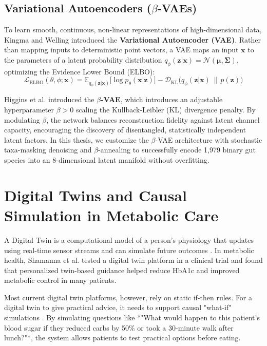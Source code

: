 \subsection{Variational Autoencoders ($\beta$-VAEs)}
To learn smooth, continuous, non-linear representations of high-dimensional data, Kingma and Welling \cite{kingma2013auto} introduced the \textbf{Variational Autoencoder (VAE)}. Rather than mapping inputs to deterministic point vectors, a VAE maps an input $\mathbf{x}$ to the parameters of a latent probability distribution $q_\phi(\mathbf{z}|\mathbf{x}) = \mathcal{N}(\boldsymbol{\mu}, \boldsymbol{\Sigma})$, optimizing the Evidence Lower Bound (ELBO):
\begin{equation}
    \mathcal{L}_{\text{ELBO}}(\theta, \phi; \mathbf{x}) = \mathbb{E}_{q_\phi(\mathbf{z}|\mathbf{x})}\big[\log p_\theta(\mathbf{x}|\mathbf{z})\big] - \mathcal{D}_{\text{KL}}\big(q_\phi(\mathbf{z}|\mathbf{x}) \,\|\, p(\mathbf{z})\big)
\end{equation}

Higgins et al. \cite{higgins2017beta} introduced the \textbf{$\beta$-VAE}, which introduces an adjustable hyperparameter $\beta > 0$ scaling the Kullback-Leibler (KL) divergence penalty. By modulating $\beta$, the network balances reconstruction fidelity against latent channel capacity, encouraging the discovery of disentangled, statistically independent latent factors. In this thesis, we customize the $\beta$-VAE architecture with stochastic taxa-masking denoising and $\beta$-annealing to successfully encode 1,979 binary gut species into an 8-dimensional latent manifold without overfitting.

\section{Digital Twins and Causal Simulation in Metabolic Care}
A Digital Twin is a computational model of a person's physiology that updates using real-time sensor streams and can simulate future outcomes \cite{voigt2021digital}. In metabolic health, Shamanna et al. \cite{shamanna2020twin} tested a digital twin platform in a clinical trial and found that personalized twin-based guidance helped reduce HbA1c and improved metabolic control in many patients.

Most current digital twin platforms, however, rely on static if-then rules. For a digital twin to give practical advice, it needs to support causal "what-if" simulations \cite{pearl2009causality}. By simulating questions like *"What would happen to this patient's blood sugar if they reduced carbs by 50\% or took a 30-minute walk after lunch?"*, the system allows patients to test practical options before eating.

